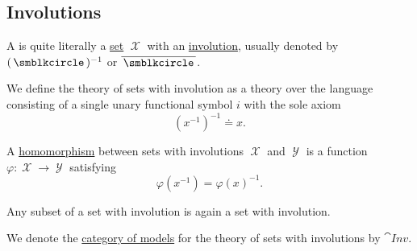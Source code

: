 \subsection{Involutions}\label{subsec:involutions}

\begin{definition}\label{def:set_with_involution}
  A  is quite literally a \hyperref[def:set_zfc]{set} \( \mscrX \) with an \hyperref[def:function/involution]{involution}, usually denoted by \( (\placeholder)^{-1} \) or \( \overline \placeholder \).

  \begin{thmenum}
     We define the theory of sets with involution as a theory over the language consisting of a single unary functional symbol \( i \) with the sole axiom
    \begin{equation}\label{eq:def:set_with_involution/theory/axiom}
      (x^{-1})^{-1} \doteq x.
    \end{equation}

     A \hyperref[def:first_order_homomorphism]{homomorphism} between sets with involutions \( \mscrX \) and \( \mscrY \) is a function \( \varphi: \mscrX \to \mscrY \) satisfying
    \begin{equation}\label{eq:def:set_with_involution/homomorphism}
      \varphi(x^{-1})
      =
      \varphi(x)^{-1}.
    \end{equation}

     Any subset of a set with involution is again a set with involution.

     We denote the \hyperref[def:category_of_first_order_models]{category of models} for the theory of sets with involutions by \( \cat{Inv} \).
  \end{thmenum}
\end{definition}
